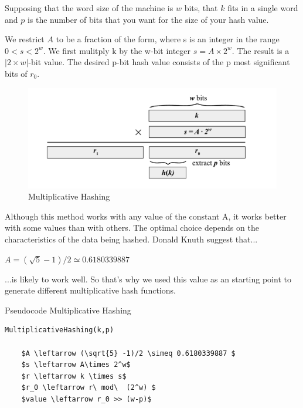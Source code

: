 \documentclass[12pt]{article}
\begin{document}
\vspace{0.4cm}
Supposing that the word size of the machine is $w$ bits, that $k$ fits in a single word and $p$ is the number of bits that you want for the size of your hash value.

 We restrict $A$ to be a fraction of the form, where s is an integer in the range $0<s<2^w$. We first mulitply k by the w-bit integer $s = A\times 2^w$. The result is a $|2 \times w| $-bit value. The desired p-bit hash value consists of the p most significant bits of $r_0$. 


\begin{figure}[H]
	\centering
	\includegraphics[scale=0.7]{graphs/MultiplicativeHashingDiagram.pdf}
	\caption{Multiplicative Hashing}
	\label{fig:MultiplicativeHashing}
\end{figure}

\bigskip

Although this method works with any value of the constant A, it works better with some values than with others. The optimal choice depends on the characteristics of the data being hashed. Donald Knuth suggest that...

$ A = (\sqrt{5} -1)/2 \simeq 0.6180339887  $

...is likely to work well. So that's why we used this value as an starting point to generate different multiplicative hash functions.
\bigskip

\begin{center}
\begin{large}
Pseudocode Multiplicative Hashing
\end{large}
\end{center}

\begin{lstlisting}[mathescape=true]
MultiplicativeHashing(k,p)

	$A \leftarrow (\sqrt{5} -1)/2 \simeq 0.6180339887 $
	$s \leftarrow A\times 2^w$
	$r \leftarrow k \times s$ 
	$r_0 \leftarrow r\ mod\  (2^w) $ 
	$value \leftarrow r_0 >> (w-p)$

\end{lstlisting}
\end{document}
